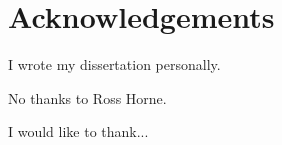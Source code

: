 \section*{Acknowledgements}

I wrote my dissertation personally.

No thanks to Ross Horne.

I would like to thank...





